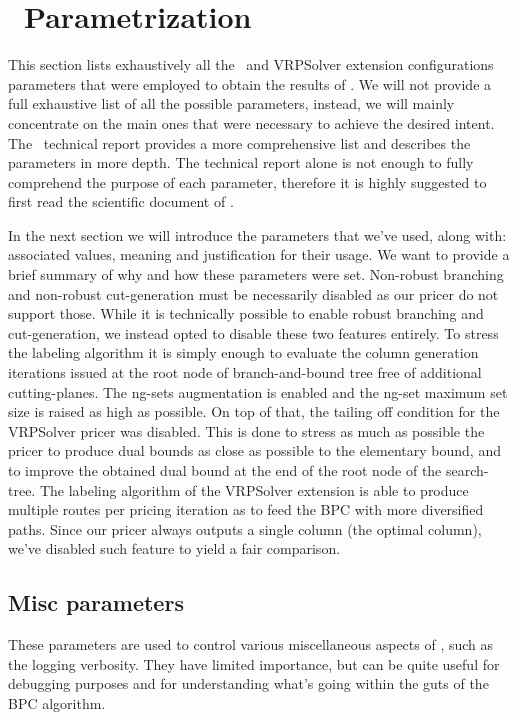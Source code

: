 \chapter{\bapcod\ Parametrization}
\label{sec:bapcod-appendix}

This section lists exhaustively all the \bapcod\ and VRPSolver extension
configurations parameters that were employed  to obtain the results of .
We will not provide a full exhaustive list of all the possible parameters,
instead, we will mainly concentrate on the main ones that were necessary to achieve
the desired intent.
The \bapcod\ technical report \textcite{sadykov2021} provides a more
comprehensive list and describes the parameters in more depth.
The technical report alone is not enough to fully comprehend the purpose of each parameter,
therefore it is highly suggested to first read the scientific document of \textcite{pessoa2020a}.

\medskip

In the next section we will introduce the parameters that we've used, along
with: associated values, meaning and justification for their usage.
We want to provide a brief summary of why and how these parameters were set.
Non-robust branching and non-robust cut-generation
must be necessarily disabled as our pricer do not support those.
While it is technically possible to enable robust branching and cut-generation,
we instead opted to disable these two features entirely.
To stress the labeling algorithm it is simply enough to evaluate
the column generation iterations issued at the root node of branch-and-bound tree
free of additional cutting-planes.
The ng-sets augmentation is enabled and the ng-set maximum
set size is raised as high as possible.
On top of that, the tailing off condition for the VRPSolver pricer was disabled.
This is done to stress as much as possible the pricer to produce
dual bounds as close as possible to the elementary bound, and to
improve the obtained dual bound at the end of the root node of the search-tree.
The labeling algorithm of the VRPSolver extension is able to produce multiple
routes per pricing iteration as to feed the BPC with more diversified paths.
Since our pricer always outputs a single column (the optimal column),
we've disabled such feature to yield a fair comparison.

\section{Misc parameters}
These parameters are used to control various miscellaneous aspects of \bapcod,
such as the logging verbosity.
They have limited importance, but can be quite useful for debugging purposes
and for understanding what's going within the guts of the BPC algorithm.

